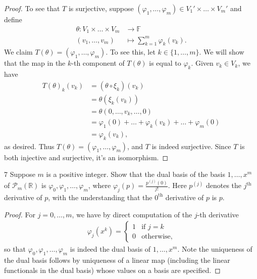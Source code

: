 \documentclass[11pt]{extarticle}
\newenvironment{problem}[1]{\begin{prob*}{#1}{}}{\end{prob*}}
\newcommand{\R}{\mathbb{R}}
\newcommand{\F}{\mathbb{F}}
\newcommand{\poly}{\mathcal{P}}
\begin{document}
\begin{proof}
\indent To see that $T$ is surjective, suppose $(\varphi_1,\dots,\varphi_m)\in V_1'\times\dots\times V_m'$ and define
\begin{align*}
\theta: V_1\times\dots\times V_m &\to \F\\
(v_1,\dots,v_m)&\mapsto \sum_{k=1}^m\varphi_k(v_k).
\end{align*}
We claim $T(\theta)=(\varphi_1,\dots,\varphi_m)$.  To see this, let $k\in\{1,\dots,m\}$.  We will show that the map in the $k$-th component of $T(\theta)$ is equal to $\varphi_k$.  Given $v_k\in V_k$, we have
\begin{align*}
T(\theta)_k(v_k) &= (\theta\circ\xi_k)(v_k)\\
&=\theta(\xi_k(v_k))\\
&=\theta(0,\dots, v_k, \dots, 0)\\
&= \varphi_1(0) + \dots + \varphi_k(v_k) + \dots + \varphi_m(0)\\
&=\varphi_k(v_k),
\end{align*}
as desired.  Thus $T(\theta) = (\varphi_1,\dots,\varphi_m)$, and $T$ is indeed surjective.  Since $T$ is both injective and surjective, it's an isomorphism.
\end{proof}

\begin{problem}{7}
Suppose $m$ is a positive integer.  Show that the dual basis of the basis $1,\dots, x^m$ of $\poly_m(\R)$ is $\varphi_0,\varphi_1,\dots,\varphi_m$, where $\varphi_j(p)=\frac{p^{(j)}(0)}{j!}$.  Here $p^{(j)}$ denotes the $j^{\text{th}}$ derivative of $p$, with the understanding that the $0^\text{th}$ derivative of $p$ is $p$.
\end{problem}
\begin{proof}
For $j=0,\dots,m$, we have by direct computation of the $j$-th derivative
\begin{align*}
\varphi_j\left(x^k\right) = \begin{cases}1 &\text{if }j = k\\0 &\text{otherwise,}\end{cases}
\end{align*}
so that $\varphi_0,\varphi_1,\dots,\varphi_m$ is indeed the dual basis of $1,\dots, x^m$.  Note the uniqueness of the dual basis follows by uniqueness of a linear map (including the linear functionals in the dual basis) whose values on a basis are specified.
\end{proof}
\end{document}
